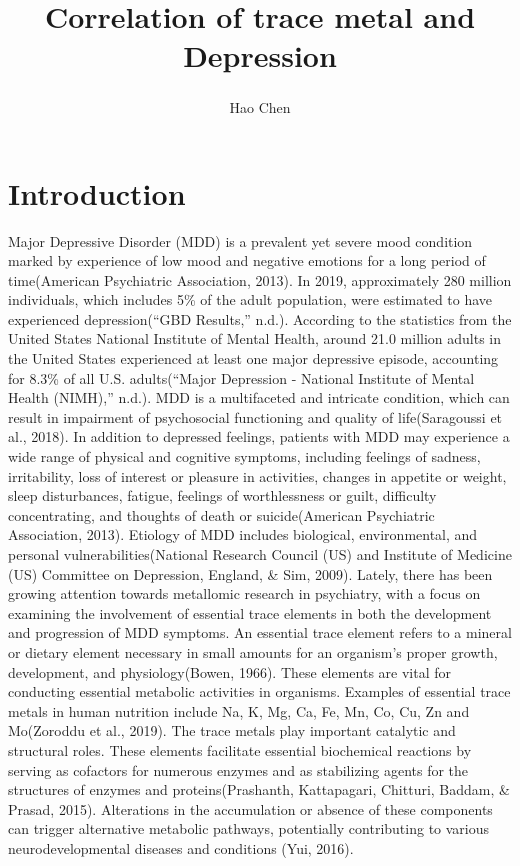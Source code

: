 \documentclass[
  man,floatsintext]{apa6}
\title{Correlation of trace metal and Depression}
\author{Hao Chen\textsuperscript{}}
\date{}
\affiliation{\vspace{0.5cm}\textsuperscript{1} University of Chicago}
\begin{document}
\maketitle

\hypertarget{introduction}{%
\section{Introduction}\label{introduction}}

Major Depressive Disorder (MDD) is a prevalent yet severe mood condition marked by experience of low mood and negative emotions for a long period of time(American Psychiatric Association, 2013). In 2019, approximately 280 million individuals, which includes 5\% of the adult population, were estimated to have experienced depression({``{GBD Results},''} n.d.). According to the statistics from the United States National Institute of Mental Health, around 21.0 million adults in the United States experienced at least one major depressive episode, accounting for 8.3\% of all U.S. adults({``Major {Depression} - {National Institute} of {Mental Health} ({NIMH}),''} n.d.).
MDD is a multifaceted and intricate condition, which can result in impairment of psychosocial functioning and quality of life(Saragoussi et al., 2018). In addition to depressed feelings, patients with MDD may experience a wide range of physical and cognitive symptoms, including feelings of sadness, irritability, loss of interest or pleasure in activities, changes in appetite or weight, sleep disturbances, fatigue, feelings of worthlessness or guilt, difficulty concentrating, and thoughts of death or suicide(American Psychiatric Association, 2013).
Etiology of MDD includes biological, environmental, and personal vulnerabilities(National Research Council (US) and Institute of Medicine (US) Committee on Depression, England, \& Sim, 2009). Lately, there has been growing attention towards metallomic research in psychiatry, with a focus on examining the involvement of essential trace elements in both the development and progression of MDD symptoms. An essential trace element refers to a mineral or dietary element necessary in small amounts for an organism's proper growth, development, and physiology(Bowen, 1966). These elements are vital for conducting essential metabolic activities in organisms. Examples of essential trace metals in human nutrition include Na, K, Mg, Ca, Fe, Mn, Co, Cu, Zn and Mo(Zoroddu et al., 2019). The trace metals play important catalytic and structural roles. These elements facilitate essential biochemical reactions by serving as cofactors for numerous enzymes and as stabilizing agents for the structures of enzymes and proteins(Prashanth, Kattapagari, Chitturi, Baddam, \& Prasad, 2015). Alterations in the accumulation or absence of these components can trigger alternative metabolic pathways, potentially contributing to various neurodevelopmental diseases and conditions (Yui, 2016).
\end{document}
